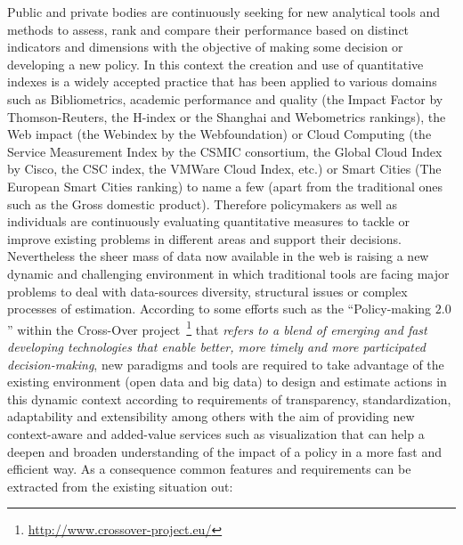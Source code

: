Public and private bodies are continuously seeking for new analytical tools and methods to assess, rank and compare their performance based 
on distinct indicators and dimensions with the objective of making some decision or developing a new policy. 
In this context the creation and use of quantitative indexes is a widely accepted practice that has been applied to various 
domains such as Bibliometrics, academic performance and quality (the Impact Factor by Thomson-Reuters, the H-index or the Shanghai and Webometrics rankings), 
the Web impact (the Webindex by the Webfoundation) or Cloud Computing (the Service Measurement Index by the CSMIC consortium, the Global Cloud Index by Cisco, 
the CSC index, the VMWare Cloud Index, etc.) or Smart Cities (The European Smart Cities ranking) to name a few (apart from the traditional ones such as the Gross domestic product). 
Therefore policymakers as well as individuals are continuously evaluating quantitative measures to tackle or improve 
existing problems in different areas and support their decisions. Nevertheless the sheer mass of data now available in the web is 
raising a new dynamic and challenging environment in which traditional tools are facing major 
problems to deal with data-sources diversity, structural issues or complex processes of estimation. According to some efforts 
such as the ``Policy-making $2.0$'' within the Cross-Over project~\footnote{\url{http://www.crossover-project.eu/}} that \textit{refers to a blend of emerging and fast developing technologies 
that enable better, more timely and more participated decision-making}, new paradigms and tools are required to take advantage of 
the existing environment (open data and big data) to design and estimate actions in this dynamic context according to requirements of 
transparency, standardization, adaptability and extensibility among others with the aim of providing new context-aware 
and added-value services such as visualization that can help a deepen and broaden understanding of the impact of a 
policy in a more fast and efficient way. As a consequence common features and requirements can be extracted from the existing situation out:
